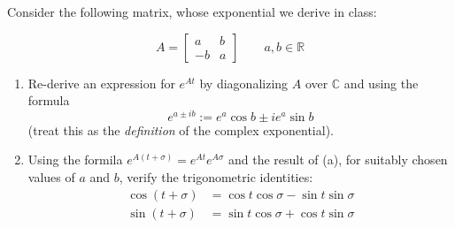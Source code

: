 Consider the following matrix, whose exponential we derive in class:

\[
A = \begin{bmatrix} a & b \\ -b & a \end{bmatrix} \qquad a, b \in \mathbb{R}
\]

\begin{enumerate}
\def\labelenumi{\alph{enumi}.}
\tightlist
\item
  Re-derive an expression for \(e^{At}\) by diagonalizing \(A\) over
  \(\mathbb{C}\) and using the formula
  \[e^{a \pm ib}:= e^a \cos b \pm ie^a \sin b\] (treat this as the
  \emph{definition} of the complex exponential).
\item
  Using the formila \(e^{A(t+\sigma)} = e^{At}e^{A \sigma}\) and the
  result of (a), for suitably chosen values of \(a\) and \(b\), verify
  the trigonometric identities: \[
    \begin{align}
    \cos (t+\sigma) &= \cos t \cos \sigma - \sin t \sin \sigma \\
    \sin (t + \sigma) &= \sin t \cos \sigma + \cos t \sin \sigma
    \end{align}
    \]
\end{enumerate}
